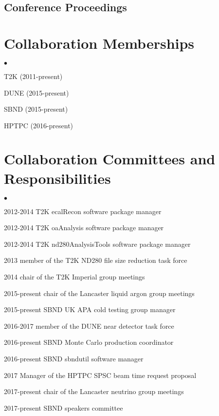 \documentclass[margin,line]{res}
\newenvironment{list2}{
  \begin{list}{$\bullet$}{%
      \setlength{\itemsep}{0in}
      \setlength{\parsep}{0in} \setlength{\parskip}{0in}
      \setlength{\topsep}{0in} \setlength{\partopsep}{0in} 
      \setlength{\leftmargin}{0.2in}}}{\end{list}}
\begin{document}
\begin{resume}
\begin{refsection}[proceedings]
\section{\sc Conference Proceedings}
\nocite{*}
\printbibliography
\end{refsection}



\section{\sc Collaboration Memberships} 
\begin{list2}
\item T2K (2011-present)
\item DUNE (2015-present)
\item SBND (2015-present)
\item HPTPC (2016-present)
\end{list2}

\section{\sc Collaboration Committees and Responsibilities} 
\begin{list2}
\item 2012-2014 T2K ecalRecon software package manager
\item 2012-2014 T2K oaAnalysis software package manager
\item 2012-2014 T2K nd280AnalysisTools software package manager
\item 2013 member of the T2K ND280 file size reduction task force
\item 2014 chair of the T2K Imperial group meetings
\item 2015-present chair of the Lancaster liquid argon group meetings
\item 2015-present SBND UK APA cold testing group manager
\item 2016-2017 member of the DUNE near detector task force
\item 2016-present SBND Monte Carlo production coordinator
\item 2016-present SBND sbndutil software manager
\item 2017 Manager of the HPTPC SPSC beam time request proposal
\item 2017-present chair of the Lancaster neutrino group meetings
\item 2017-present SBND speakers committee 
\end{list2}


\end{resume}
\end{document}
